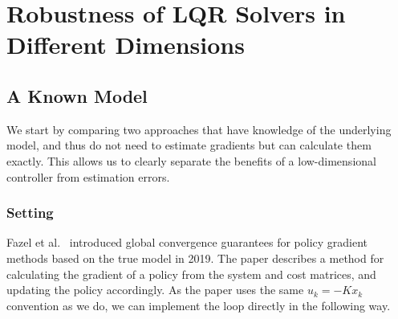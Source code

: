\chapter{Robustness of LQR Solvers in Different Dimensions}
\label{chap:lqr}

\section{A Known Model}
\label{sec:known-model}

We start by comparing two approaches that have knowledge of the underlying model,
and thus do not need to estimate gradients but can calculate them exactly. This allows
us to clearly separate the benefits of a low-dimensional controller from estimation
errors.

\subsection{Setting}
\label{subsec:known-model-setting}

Fazel et al.~\cite{Fazel2018Global} introduced global convergence guarantees for policy gradient methods based on the
true model in 2019. The paper describes a method for calculating the gradient of a policy from
the system and cost matrices, and updating the policy accordingly. As the paper uses the same $u_k = -K x_k$
convention as we do, we can implement the loop directly in the following way.

